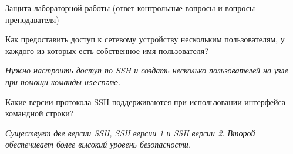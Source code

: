 \documentclass[a4paper,14pt]{extarticle}
\begin{document}
\begin{mypart}{Защита лабораторной работы (ответ контрольные вопросы
		и вопросы преподавателя)}

\q Как предоставить доступ к сетевому устройству нескольким пользователям, у каждого из которых есть
собственное имя пользователя?

\ans \textit{Нужно настроить доступ по SSH и создать несколько пользователей на узле при
помощи команды \texttt{username}}.

\q Какие версии протокола SSH поддерживаются при использовании интерфейса командной строки?

\ans \textit{Существует две версии SSH, SSH версии 1 и SSH версии 2. Второй обеспечивает более высокий уровень безопасности.}
\end{mypart}
\end{document}
